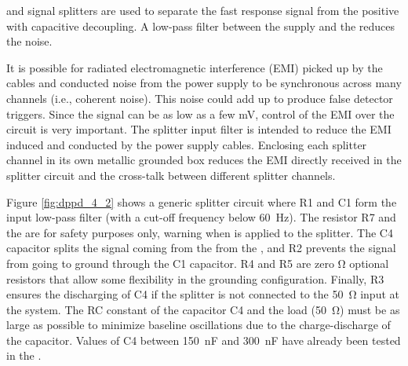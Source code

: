  and signal splitters %
are used to separate the fast  response signal from the positive  with capacitive decoupling. %
A low-pass filter between the  supply and the  %
reduces the noise.

It is possible for radiated electromagnetic interference (EMI) picked up by the cables and conducted noise from the  power supply to be synchronous across many  channels (i.e., coherent noise). This noise could add up to produce false detector triggers. Since the  signal can be as low as a few \si{mV}, %
control of the EMI over the circuit is very important. The splitter  input filter is intended to reduce the EMI induced and conducted by the power supply cables. Enclosing each splitter channel in its own metallic grounded box reduces the EMI directly received in the splitter circuit and %
the cross-talk between different splitter channels.

Figure \ref{fig:dppd_4_2} shows a generic splitter circuit where R1 and C1 form the  input low-pass filter (with a cut-off frequency below \SI{60}{Hz}). The resistor R7 and the   are for safety purposes only, warning when  is applied to the splitter. The C4 capacitor splits the signal coming from the  from the , and R2 prevents the  signal from going to ground through the C1 capacitor. R4 and R5 are zero \si{\ohm} optional resistors that allow some flexibility in the grounding configuration. Finally, R3 ensures the discharging of C4 if the splitter is not connected to the \SI{50}{\ohm} input at the  system. The RC constant of the capacitor C4 and the load (\SI{50}{\ohm}) must be as large as possible to minimize baseline oscillations due to the charge-discharge of the capacitor. Values of C4 between \SI{150}{nF} and \SI{300}{nF} have already been tested in the  . %

